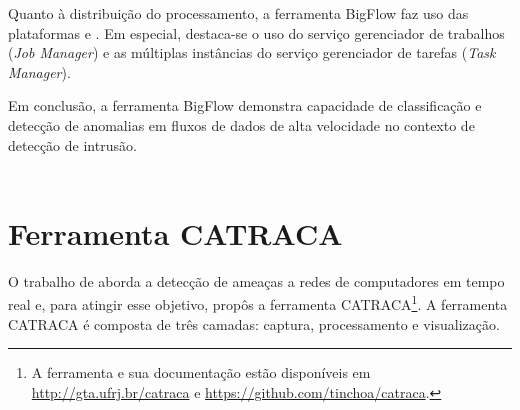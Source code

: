 
Quanto à distribuição do processamento,
a ferramenta BigFlow faz uso das plataformas \flink e \kafka.
Em especial, destaca-se o uso do serviço gerenciador de trabalhos (\emph{Job
Manager}) e as múltiplas instâncias do serviço gerenciador de tarefas
(\emph{Task Manager}).


Em conclusão, a ferramenta BigFlow demonstra capacidade de classificação e
detecção de anomalias em fluxos de dados de alta velocidade no contexto de
detecção de intrusão.
\\
\\


\section{Ferramenta CATRACA}

O trabalho de  aborda a detecção de ameaças a redes de
computadores em tempo real e, para atingir esse objetivo, propôs a ferramenta
CATRACA\footnote{
    A ferramenta e sua documentação estão disponíveis em
    \url{http://gta.ufrj.br/catraca}
    e \url{https://github.com/tinchoa/catraca}.
}.
A ferramenta CATRACA é composta de três camadas: captura, processamento e
visualização.

